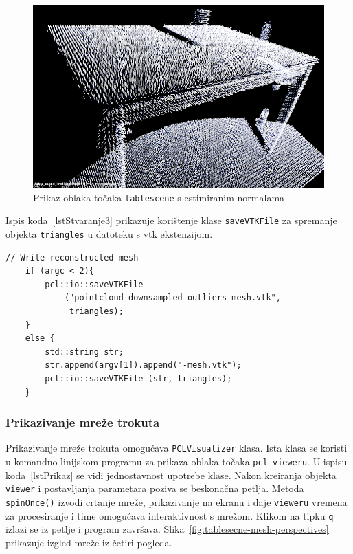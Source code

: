 
\begin{figure}[h]
\centering
\includegraphics[scale=0.5]{figures/tablescene-normals.png}
\caption{Prikaz oblaka točaka \texttt{tablescene} s estimiranim
normalama }
\label{fig:tablescene-normals}
\end{figure}

Ispis koda~\ref{lstStvaranje3} prikazuje korištenje klase
\texttt{saveVTKFile} za spremanje objekta \texttt{triangles} u datoteku
s vtk ekstenzijom.

\begin{lstlisting}[label=lstStvaranje3,caption={Dio izvornog koda za
    zapisivanju mreže iz funkcije \texttt{reconstruct\_mesh()} }]
    // Write reconstructed mesh
    if (argc < 2){
        pcl::io::saveVTKFile
            ("pointcloud-downsampled-outliers-mesh.vtk",
             triangles);
    }
    else {
        std::string str;
        str.append(argv[1]).append("-mesh.vtk");
        pcl::io::saveVTKFile (str, triangles);
    }
\end{lstlisting}


\newpage
\subsubsection{Prikazivanje mreže trokuta} %
\label{ssub:Prikazivanje mreže trokuta}
Prikazivanje mreže trokuta omogućava \texttt{PCLVisualizer} klasa. Ista
klasa se koristi u komandno linijskom programu za prikaza oblaka točaka
\texttt{pcl\_vieweru}. U ispisu koda~\ref{lstPrikaz} se vidi
jednostavnost upotrebe klase. Nakon kreiranja objekta \texttt{viewer} i
postavljanja parametara poziva se beskonačna petlja. Metoda
\texttt{spinOnce()} izvodi crtanje mreže, prikazivanje na ekranu i
daje \texttt{vieweru} vremena za procesiranje i time omogućava
interaktivnost s mrežom. Klikom na tipku \texttt{q} izlazi se iz petlje
i program završava. Slika~\ref{fig:tablesecne-mesh-perspectives}
prikazuje izgled mreže iz četiri pogleda.


